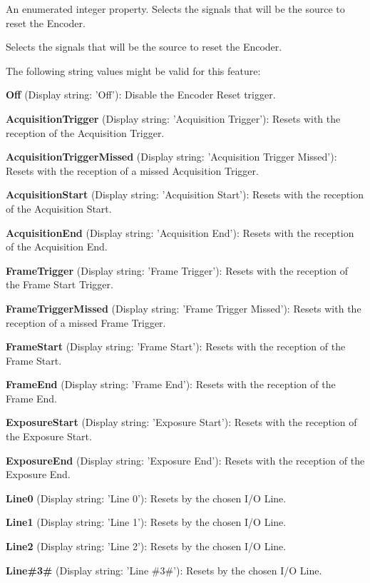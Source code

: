 An enumerated integer property. Selects the signals that will be the source to reset the Encoder. 

Selects the signals that will be the source to reset the Encoder.

The following string values might be valid for this feature\+:
\begin{DoxyItemize}
\item {\bfseries Off} (Display string\+: 'Off')\+: Disable the Encoder Reset trigger.
\item {\bfseries Acquisition\+Trigger} (Display string\+: 'Acquisition Trigger')\+: Resets with the reception of the Acquisition Trigger.
\item {\bfseries Acquisition\+Trigger\+Missed} (Display string\+: 'Acquisition Trigger Missed')\+: Resets with the reception of a missed Acquisition Trigger.
\item {\bfseries Acquisition\+Start} (Display string\+: 'Acquisition Start')\+: Resets with the reception of the Acquisition Start.
\item {\bfseries Acquisition\+End} (Display string\+: 'Acquisition End')\+: Resets with the reception of the Acquisition End.
\item {\bfseries Frame\+Trigger} (Display string\+: 'Frame Trigger')\+: Resets with the reception of the Frame Start Trigger.
\item {\bfseries Frame\+Trigger\+Missed} (Display string\+: 'Frame Trigger Missed')\+: Resets with the reception of a missed Frame Trigger.
\item {\bfseries Frame\+Start} (Display string\+: 'Frame Start')\+: Resets with the reception of the Frame Start.
\item {\bfseries Frame\+End} (Display string\+: 'Frame End')\+: Resets with the reception of the Frame End.
\item {\bfseries Exposure\+Start} (Display string\+: 'Exposure Start')\+: Resets with the reception of the Exposure Start.
\item {\bfseries Exposure\+End} (Display string\+: 'Exposure End')\+: Resets with the reception of the Exposure End.
\item {\bfseries Line0} (Display string\+: 'Line 0')\+: Resets by the chosen I/\+O Line.
\item {\bfseries Line1} (Display string\+: 'Line 1')\+: Resets by the chosen I/\+O Line.
\item {\bfseries Line2} (Display string\+: 'Line 2')\+: Resets by the chosen I/\+O Line.
\item {\bfseries Line\#3\#} (Display string\+: 'Line \#3\#')\+: Resets by the chosen I/\+O Line.

\end{DoxyItemize}
